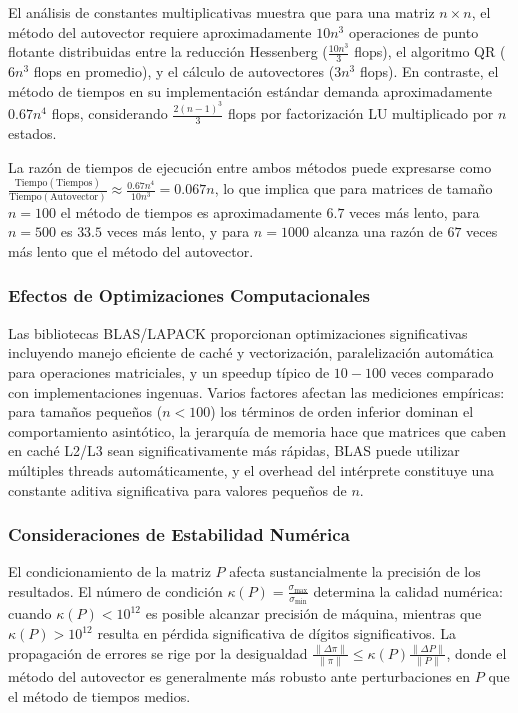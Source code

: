El análisis de constantes multiplicativas muestra que para una matriz $n \times n$, el método del autovector requiere aproximadamente $10n^3$ operaciones de punto flotante distribuidas entre la reducción Hessenberg ($\frac{10n^3}{3}$ flops), el algoritmo QR ($6n^3$ flops en promedio), y el cálculo de autovectores ($3n^3$ flops). En contraste, el método de tiempos en su implementación estándar demanda aproximadamente $0.67n^4$ flops, considerando $\frac{2(n-1)^3}{3}$ flops por factorización LU multiplicado por $n$ estados.

La razón de tiempos de ejecución entre ambos métodos puede expresarse como $\frac{\text{Tiempo}(\text{Tiempos})}{\text{Tiempo}(\text{Autovector})} \approx \frac{0.67n^4}{10n^3} = 0.067n$, lo que implica que para matrices de tamaño $n = 100$ el método de tiempos es aproximadamente $6.7$ veces más lento, para $n = 500$ es $33.5$ veces más lento, y para $n = 1000$ alcanza una razón de $67$ veces más lento que el método del autovector.

\subsubsection{Efectos de Optimizaciones Computacionales}

Las bibliotecas BLAS/LAPACK proporcionan optimizaciones significativas incluyendo manejo eficiente de caché y vectorización, paralelización automática para operaciones matriciales, y un speedup típico de $10-100$ veces comparado con implementaciones ingenuas. Varios factores afectan las mediciones empíricas: para tamaños pequeños ($n < 100$) los términos de orden inferior dominan el comportamiento asintótico, la jerarquía de memoria hace que matrices que caben en caché L2/L3 sean significativamente más rápidas, BLAS puede utilizar múltiples threads automáticamente, y el overhead del intérprete constituye una constante aditiva significativa para valores pequeños de $n$.

\subsubsection{Consideraciones de Estabilidad Numérica}

El condicionamiento de la matriz $P$ afecta sustancialmente la precisión de los resultados. El número de condición $\kappa(P) = \frac{\sigma_{\max}}{\sigma_{\min}}$ determina la calidad numérica: cuando $\kappa(P) < 10^{12}$ es posible alcanzar precisión de máquina, mientras que $\kappa(P) > 10^{12}$ resulta en pérdida significativa de dígitos significativos. La propagación de errores se rige por la desigualdad $\frac{\|\Delta \pi\|}{\|\pi\|} \leq \kappa(P) \frac{\|\Delta P\|}{\|P\|}$, donde el método del autovector es generalmente más robusto ante perturbaciones en $P$ que el método de tiempos medios.

